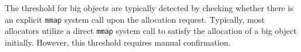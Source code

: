 The threshold for big objects are typically detected by checking whether there is an explicit \texttt{mmap} system call upon the allocation request. Typically, most allocators utilize a direct \texttt{mmap} system call to satisfy the allocation of a big object initially. However, this threshold requires manual confirmation. 
